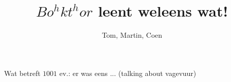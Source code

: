 \documentclass[openany]{article}
\title{$Bo^{h}kt^{h}or$ leent weleens wat!}
\author{Tom, Martin, Coen}
\begin{document}
\maketitle

\tableofcontents
{}



\begin{songs}{} %



\renewcommand{\lyricfont}{\sffamily\large}




\setcounter{songnum}{666}

			
			
			
			
			
			



\setcounter{songnum}{1001}  
	
		\beginscripture{()}
			Wat betreft $1001$ ev.: er was eens ...
			(talking about vagevuur) 
		\endscripture
	
	
\end{songs}




\end{document}
